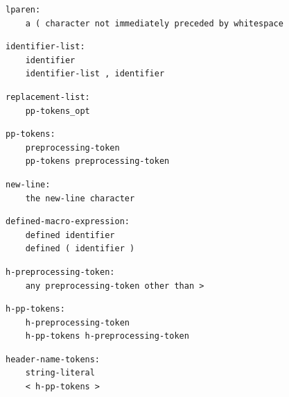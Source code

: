 \noindent\textbf{\texttt{}}\par
\begin{lstlisting}
lparen:
    a ( character not immediately preceded by whitespace
\end{lstlisting}

\noindent\textbf{\texttt{}}\par
\begin{lstlisting}
identifier-list:
    identifier
    identifier-list , identifier
\end{lstlisting}

\noindent\textbf{\texttt{}}\par
\begin{lstlisting}
replacement-list:
    pp-tokens_opt
\end{lstlisting}

\noindent\textbf{\texttt{}}\par
\begin{lstlisting}
pp-tokens:
    preprocessing-token
    pp-tokens preprocessing-token
\end{lstlisting}

\noindent\textbf{\texttt{}}\par
\begin{lstlisting}
new-line:
    the new-line character
\end{lstlisting}

\noindent\textbf{\texttt{}}\par
\begin{lstlisting}
defined-macro-expression:
    defined identifier
    defined ( identifier )
\end{lstlisting}

\noindent\textbf{\texttt{}}\par
\begin{lstlisting}
h-preprocessing-token:
    any preprocessing-token other than >
\end{lstlisting}

\noindent\textbf{\texttt{}}\par
\begin{lstlisting}
h-pp-tokens:
    h-preprocessing-token
    h-pp-tokens h-preprocessing-token
\end{lstlisting}

\noindent\textbf{\texttt{}}\par
\begin{lstlisting}
header-name-tokens:
    string-literal
    < h-pp-tokens >
\end{lstlisting}

